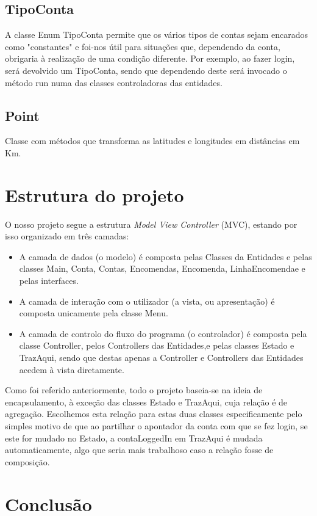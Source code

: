 \documentclass[a4paper]{report}
\begin{document}
	 \section{TipoConta}
	 A classe Enum TipoConta permite que os vários tipos de contas sejam encarados como "constantes" e foi-nos útil para situações que, dependendo da conta, obrigaria à realização de uma condição diferente. Por exemplo, ao fazer login, será devolvido um TipoConta, sendo que dependendo deste será invocado o método run numa das classes controladoras das entidades.
	 
	\section{Point}
	Classe com métodos que transforma as latitudes e longitudes em distâncias em Km.
	\chapter{Estrutura do projeto}
	
	O nosso projeto segue a estrutura \textit{Model View Controller} (MVC), estando por isso organizado em três camadas:
	\begin{itemize}
		\item A camada de dados (o modelo) é composta pelas Classes da Entidades e pelas classes Main, Conta, Contas, Encomendas, Encomenda, LinhaEncomendae e pelas interfaces.
		\item A camada de interação com o utilizador (a vista, ou apresentação) é composta unicamente pela classe Menu.
		\item A camada de controlo do fluxo do programa (o controlador) é composta pela classe Controller, pelos Controllers das Entidades,e pelas classes Estado e TrazAqui, sendo que destas apenas a Controller e Controllers das Entidades acedem à vista diretamente.
	\end{itemize}
      Como foi referido anteriormente, todo o projeto baseia-se na ideia de encapsulamento, à exceção das classes Estado e TrazAqui, cuja relação é de agregação. Escolhemos esta relação para estas duas classes especificamente pelo simples motivo de que ao partilhar o apontador da conta com que se fez login, se este for mudado no Estado, a contaLoggedIn em TrazAqui é mudada automaticamente, algo que seria mais trabalhoso caso a relação fosse de composição.
      

	
	

	\chapter{Conclusão}
\end{document}
